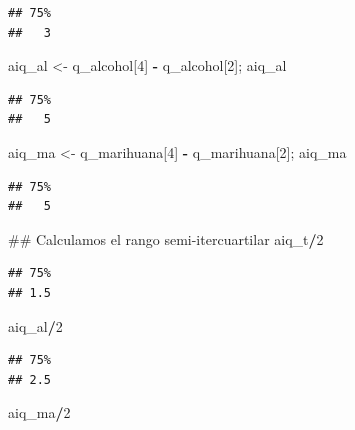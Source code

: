 \documentclass[spanish,]{book}
\newenvironment{Shaded}{\begin{snugshade}}{\end{snugshade}}
\newcommand{\DecValTok}[1]{\textcolor[rgb]{0.00,0.00,0.81}{#1}}
\newcommand{\StringTok}[1]{\textcolor[rgb]{0.31,0.60,0.02}{#1}}
\newcommand{\OperatorTok}[1]{\textcolor[rgb]{0.81,0.36,0.00}{\textbf{#1}}}
\newcommand{\NormalTok}[1]{#1}
\begin{document}
\begin{verbatim}
## 75% 
##   3
\end{verbatim}

\begin{Shaded}
\begin{Highlighting}[]
\NormalTok{aiq_al <-}\StringTok{ }\NormalTok{q_alcohol[}\DecValTok{4}\NormalTok{] }\OperatorTok{-}\StringTok{ }\NormalTok{q_alcohol[}\DecValTok{2}\NormalTok{]; aiq_al}
\end{Highlighting}
\end{Shaded}

\begin{verbatim}
## 75% 
##   5
\end{verbatim}

\begin{Shaded}
\begin{Highlighting}[]
\NormalTok{aiq_ma <-}\StringTok{ }\NormalTok{q_marihuana[}\DecValTok{4}\NormalTok{] }\OperatorTok{-}\StringTok{ }\NormalTok{q_marihuana[}\DecValTok{2}\NormalTok{]; aiq_ma}
\end{Highlighting}
\end{Shaded}

\begin{verbatim}
## 75% 
##   5
\end{verbatim}

\begin{Shaded}
\begin{Highlighting}[]
\NormalTok{## Calculamos el rango semi-itercuartilar}
\NormalTok{aiq_t}\OperatorTok{/}\DecValTok{2}
\end{Highlighting}
\end{Shaded}

\begin{verbatim}
## 75% 
## 1.5
\end{verbatim}

\begin{Shaded}
\begin{Highlighting}[]
\NormalTok{aiq_al}\OperatorTok{/}\DecValTok{2}
\end{Highlighting}
\end{Shaded}

\begin{verbatim}
## 75% 
## 2.5
\end{verbatim}

\begin{Shaded}
\begin{Highlighting}[]
\NormalTok{aiq_ma}\OperatorTok{/}\DecValTok{2}
\end{Highlighting}
\end{Shaded}
\end{document}
